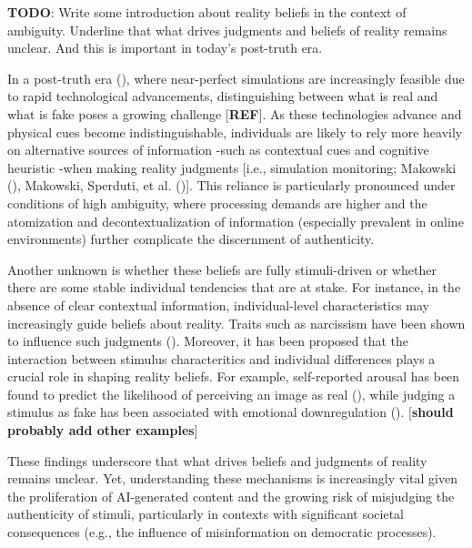 \documentclass[
  jou,
  floatsintext,
  longtable,
  nolmodern,
  notxfonts,
  notimes,
  colorlinks=true,linkcolor=blue,citecolor=blue,urlcolor=blue]{apa7}
\begin{document}
\textbf{TODO}: Write some introduction about reality beliefs in the
context of ambiguity. Underline that what drives judgments and beliefs
of reality remains unclear. And this is important in today's post-truth
era.

In a post-truth era (), where near-perfect simulations are increasingly feasible
due to rapid technological advancements, distinguishing between what is
real and what is fake poses a growing challenge {[}\textbf{REF}{]}. As
these technologies advance and physical cues become indistinguishable,
individuals are likely to rely more heavily on alternative sources of
information -such as contextual cues and cognitive heuristic -when
making reality judgments {[}i.e., simulation monitoring; Makowski
(), Makowski, Sperduti, et al.
(){]}. This reliance is
particularly pronounced under conditions of high ambiguity, where
processing demands are higher and the atomization and
decontextualization of information (especially prevalent in online
environments) further complicate the discernment of authenticity.

Another unknown is whether these beliefs are fully stimuli-driven or
whether there are some stable individual tendencies that are at stake.
For instance, in the absence of clear contextual information,
individual-level characteristics may increasingly guide beliefs about
reality. Traits such as narcissism have been shown to influence such
judgments ().
Moreover, it has been proposed that the interaction between stimulus
characteritics and individual differences plays a crucial role in
shaping reality beliefs. For example, self-reported arousal has been
found to predict the likelihood of perceiving an image as real
(), while judging a
stimulus as fake has been associated with emotional downregulation
(). {[}\textbf{should probably add other examples}{]}

These findings underscore that what drives beliefs and judgments of
reality remains unclear. Yet, understanding these mechanisms is
increasingly vital given the proliferation of AI-generated content and
the growing risk of misjudging the authenticity of stimuli, particularly
in contexts with significant societal consequences (e.g., the influence
of misinformation on democratic processes).
\end{document}
